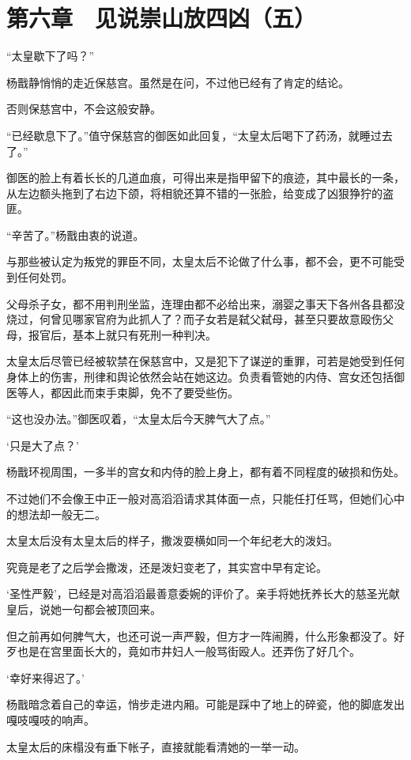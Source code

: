 \section{第六章　见说崇山放四凶（五）}

“太皇歇下了吗？”

杨戬静悄悄的走近保慈宫。虽然是在问，不过他已经有了肯定的结论。

否则保慈宫中，不会这般安静。

“已经歇息下了。”值守保慈宫的御医如此回复，“太皇太后喝下了药汤，就睡过去了。”

御医的脸上有着长长的几道血痕，可得出来是指甲留下的痕迹，其中最长的一条，从左边额头拖到了右边下颌，将相貌还算不错的一张脸，给变成了凶狠狰狞的盗匪。

“辛苦了。”杨戬由衷的说道。

与那些被认定为叛党的罪臣不同，太皇太后不论做了什么事，都不会，更不可能受到任何处罚。

父母杀子女，都不用判刑坐监，连理由都不必给出来，溺婴之事天下各州各县都没烧过，何曾见哪家官府为此抓人了？而子女若是弑父弑母，甚至只要故意殴伤父母，报官后，基本上就只有死刑一种判决。

太皇太后尽管已经被软禁在保慈宫中，又是犯下了谋逆的重罪，可若是她受到任何身体上的伤害，刑律和舆论依然会站在她这边。负责看管她的内侍、宫女还包括御医等人，都因此而束手束脚，免不了要受些伤。

“这也没办法。”御医叹着，“太皇太后今天脾气大了点。”

‘只是大了点？’

杨戬环视周围，一多半的宫女和内侍的脸上身上，都有着不同程度的破损和伤处。

不过她们不会像王中正一般对高滔滔请求其体面一点，只能任打任骂，但她们心中的想法却一般无二。

太皇太后没有太皇太后的样子，撒泼耍横如同一个年纪老大的泼妇。

究竟是老了之后学会撒泼，还是泼妇变老了，其实宫中早有定论。

‘圣性严毅’，已经是对高滔滔最善意委婉的评价了。亲手将她抚养长大的慈圣光献皇后，说她一句都会被顶回来。

但之前再如何脾气大，也还可说一声严毅，但方才一阵闹腾，什么形象都没了。好歹也是在宫里面长大的，竟如市井妇人一般骂街殴人。还弄伤了好几个。

‘幸好来得迟了。’

杨戬暗念着自己的幸运，悄步走进内厢。可能是踩中了地上的碎瓷，他的脚底发出嘎吱嘎吱的响声。

太皇太后的床榻没有垂下帐子，直接就能看清她的一举一动。

